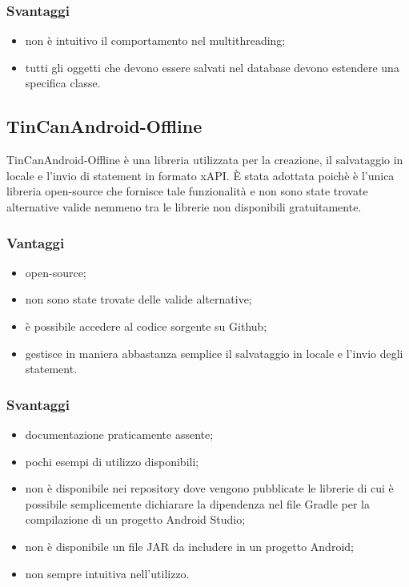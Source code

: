\documentclass[../Tesi.tex]{subfiles}
\begin{document}
		\subsubsection{Svantaggi}
			\begin{itemize}
				\item non è intuitivo il comportamento nel multithreading;
				\item tutti gli oggetti che devono essere salvati nel database devono estendere una specifica classe.
			\end{itemize}

	\subsection{TinCanAndroid-Offline}
		TinCanAndroid-Offline è una libreria utilizzata per la creazione, il salvataggio in locale e l'invio di statement in formato xAPI. È stata adottata poichè è l'unica libreria open-source che fornisce tale funzionalità e non sono state trovate alternative valide nemmeno tra le librerie non disponibili gratuitamente.
		\subsubsection{Vantaggi}
			\begin{itemize}
				\item open-source;
				\item non sono state trovate delle valide alternative;
				\item è possibile accedere al codice sorgente su Github;
				\item gestisce in maniera abbastanza semplice il salvataggio in locale e l'invio degli statement.
			\end{itemize}
		\subsubsection{Svantaggi}
			\begin{itemize}
				\item documentazione praticamente assente;
				\item pochi esempi di utilizzo disponibili;
				\item non è disponibile nei repository dove vengono pubblicate le librerie di cui è possibile semplicemente dichiarare la dipendenza nel file Gradle per la compilazione di un progetto Android Studio;
				\item non è disponibile un file JAR da includere in un progetto Android;
				\item non sempre intuitiva nell'utilizzo.
			\end{itemize}
	
\end{document}
